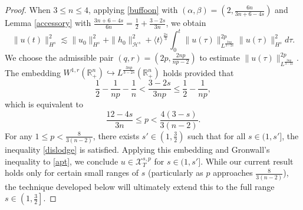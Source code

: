 \documentclass[preprint,compress,12pt]{elsarticle}
\numberwithin{equation}{section}
\begin{document}
\begin{proof}
	
	When $3\leq n\leq4$, applying \eqref{buffoon} with $(\alpha,\beta)=(2,\frac{6n}{3n+6-4s})$ and Lemma \ref{accessory} with $\frac{3n+6-4s}{6n}=\frac{1}{2}+\frac{3-2s}{3n}$, we obtain
	\begin{equation}\label{apt}
		\|u(t)\|_{H^{s}}^{2}\lesssim \|u_{0}\|_{H^{s}}^{2}+\|h_{0}\|_{\mathcal{H}^{s}}^{2}+ \langle t\rangle^{\frac{2s}{3}} \int_{0}^{t} \|u(\tau)\|_{L^{\frac{3np}{3-2s}}}^{2p} \|u(\tau)\|_{H^{s}}^{2}d\tau.
	\end{equation}
	We choose the admissible pair $(q,r) = \left(2p, \frac{2np}{np-2}\right)$ to estimate  $\|u(\tau)\|_{L^{\frac{3np}{3-2s}}}^{2p}$. The embedding $W^{1,r}(\mathbb{R}_{+}^{n})\hookrightarrow L^{\frac{3np}{3-2s}}(\mathbb{R}_{+}^{n})$ holds provided that
	\begin{equation*}
		\frac{1}{2}-\frac{1}{np}-\frac{1}{n} <\frac{3-2s}{3np}\leq \frac{1}{2}-\frac{1}{np},
	\end{equation*}
	which is equivalent to
	\begin{equation}\label{dislodge}
		\frac{12-4s}{3n}\leq	p<\frac{4(3-s)}{3(n-2)}.
	\end{equation}
	For any $1\leq p<\frac{8}{3(n-2)}$, there exists $s'\in\left(1,\frac{3}{2}\right)$ such that for all $s\in(1,s']$, the inequality \eqref{dislodge} is satisfied. Applying this  embedding and Gronwall's inequality to \eqref{apt}, we conclude $u\in\mathscr{X}^{s,p}_{T}$ for $s\in (1,s']$.
	While our current result holds only for certain small ranges of $s$ (particularly as $p$ approaches $\frac{8}{3(n-2)}$), the technique developed below will ultimately extend this to the full range $s \in \left(1,\frac{3}{2}\right]$.
	

\end{proof}
\end{document}
